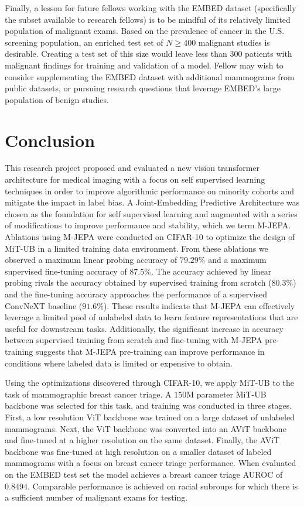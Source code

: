 \documentclass[12pt]{article}
\begin{document}
Finally, a lesson for future fellows working with the EMBED dataset (specifically the subset available to research fellows) is to be mindful of its relatively limited population of malignant exams. Based on the prevalence of cancer in the U.S. screening population, an enriched test set of $N \geq 400$ malignant studies is desirable. Creating a test set of this size would leave less than $300$ patients with malignant findings for training and validation of a model. Fellow may wish to consider supplementing the EMBED dataset with additional mammograms from public datasets, or pursuing research questions that leverage EMBED's large population of benign studies.

\section{Conclusion}
\noindent

This research project proposed and evaluated a new vision transformer architecture for medical imaging with a focus on
self supervised learning techniques in order to improve algorithmic performance on minority cohorts and mitigate the impact in label bias.
A Joint-Embedding Predictive Architecture was chosen as the foundation for self supervised learning and augmented with a series of modifications to improve performance and stability, which we term M-JEPA. Ablations using M-JEPA were conducted on CIFAR-10 to optimize the design of MiT-UB in a limited training data environment. From these ablations we observed a maximum linear probing accuracy of $79.29\%$ and a maximum supervised fine-tuning accuracy of $87.5\%$. The accuracy achieved by linear probing rivals the accuracy obtained by supervised training from scratch ($80.3\%$) and the fine-tuning accuracy approaches the performance of a supervised ConvNeXT baseline ($91.6\%$). These results indicate that M-JEPA can effectively leverage a limited pool of unlabeled data to learn feature representations that are useful for downstream tasks.
Additionally, the significant increase in accuracy between supervised training from scratch and fine-tuning with M-JEPA pre-training suggests that M-JEPA pre-training can improve performance in conditions where labeled data is limited or expensive to obtain.

Using the optimizations discovered through CIFAR-10, we apply MiT-UB to the task of mammographic breast cancer triage. 
A $150\mathrm{M}$ parameter MiT-UB backbone was selected for this task, and training was conducted in three stages. First, a low resolution ViT backbone was trained on a large dataset of unlabeled mammograms. Next, the ViT backbone was converted into an AViT backbone and fine-tuned at a higher resolution on the same dataset. Finally, the AViT backbone was fine-tuned at high resolution on a smaller dataset of labeled mammograms with a focus on breast cancer triage performance.
When evaluated on the EMBED test set the model achieves a breast cancer triage AUROC of $0.8494$. Comparable performance is achieved on racial subroups for which there is a sufficient number of malignant exams for testing.
\end{document}
